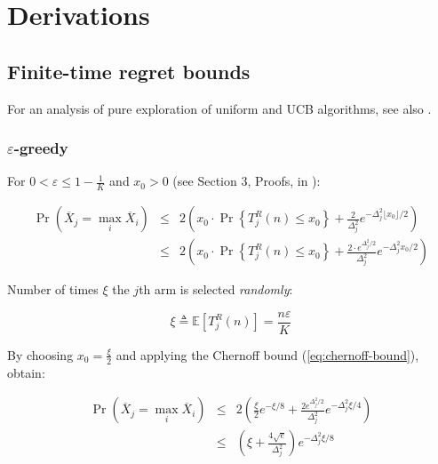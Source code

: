 \documentclass{article}
\newcommand {\IE} {\ensuremath {\mathbb{E}}}
\begin{document}
\section{Derivations}
\label{app:derivations}

\subsection{Finite-time regret bounds}
\label{app:derivations-finite}


For an analysis of pure exploration of uniform and UCB algorithms, see also
\cite{Bubeck.pure}.


\subsubsection{$\varepsilon$-greedy}
\label{app:derivations-finite-eps}

For $0<\varepsilon\le1-\frac 1 K$ and $x_0>0$ (see Section 3, Proofs, in \cite{Auer.ucb}):

\begin{eqnarray}
\Pr(\overline X_j=\max_i\overline X_i)&\le&2\left(x_0\cdot \Pr\left\{T_j^R(n)\le x_0\right\} + \frac 2{\Delta_j^2}e^{-\Delta_j^2\lfloor x_0 \rfloor/2}\right)\nonumber\\
&\le&2\left(x_0\cdot \Pr\left\{T_j^R(n)\le x_0\right\} + \frac {2 \cdot
  e^{\Delta_j^2/2}}{\Delta_j^2}e^{-\Delta_j^2 x_0 /2}\right)
\end{eqnarray}

Number of times $\xi$ the $j$th arm is selected {\it randomly}:

\begin{equation}
\xi\triangleq\IE\left[T_j^R(n)\right]=\frac {n\varepsilon} K
\end{equation}

By choosing $x_0=\frac \xi 2$ and applying the Chernoff bound (\ref{eq:chernoff-bound}), obtain:

\begin{eqnarray}
\label{eq:pr-epsilon-greedy}
\Pr(\overline X_j=\max_i\overline X_i)&\le& 2\left(\frac {\xi}{2} e^{-\xi/8} + \frac {2e^{\Delta_j^2/2}}{\Delta_j^2}e^{-\Delta_j^2 \xi/4}\right)\nonumber\\
&\le&\left(\xi + \frac {4\sqrt e}{\Delta_j^2}\right)e^{-\Delta_j^2\xi/8}
\end{eqnarray}
\end{document}
